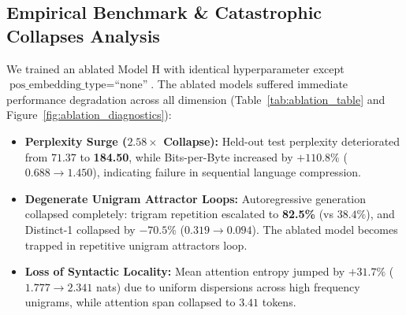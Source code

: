 \documentclass[10pt,a4paper]{article}
\begin{document}
\subsection{Empirical Benchmark \& Catastrophic Collapses Analysis}
We trained an ablated Model H with identical hyperparameter except $\text{pos\_embedding\_type} = \text{``none''}$. The ablated models suffered immediate performance degradation across all dimension (Table~\ref{tab:ablation_table} and Figure~\ref{fig:ablation_diagnostics}):
\begin{itemize}
    \item \textbf{Perplexity Surge ($2.58\times$ Collapse):} Held-out test perplexity deteriorated from $71.37$ to \textbf{184.50}, while Bits-per-Byte increased by $+110.8\%$ ($0.688 \to 1.450$), indicating failure in sequential language compression.
    \item \textbf{Degenerate Unigram Attractor Loops:} Autoregressive generation collapsed completely: trigram repetition escalated to \textbf{82.5\%} (vs $38.4\%$), and Distinct-1 collapsed by $-70.5\%$ ($0.319 \to 0.094$). The ablated model becomes trapped in repetitive unigram attractors loop.
    \item \textbf{Loss of Syntactic Locality:} Mean attention entropy jumped by $+31.7\%$ ($1.777 \to 2.341$ nats) due to uniform dispersions across high frequency unigrams, while attention span collapsed to $3.41$ tokens.
\end{itemize}
\end{document}

